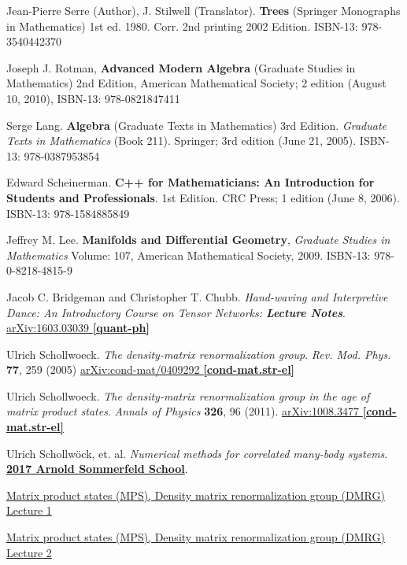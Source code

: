 \documentclass[10pt]{amsart}
\begin{document}
\begin{thebibliography}{9}
Jean-Pierre Serre (Author), J. Stilwell (Translator).  \textbf{Trees} (Springer Monographs in Mathematics) 1st ed. 1980. Corr. 2nd printing 2002 Edition.  ISBN-13: 978-3540442370

Joseph J. Rotman, \textbf{Advanced Modern Algebra} (Graduate Studies in Mathematics) 2nd Edition, American Mathematical Society; 2 edition (August 10, 2010), ISBN-13: 978-0821847411

Serge Lang. \textbf{Algebra} (Graduate Texts in Mathematics) 3rd Edition. \emph{Graduate Texts in Mathematics} (Book 211). Springer; 3rd edition (June 21, 2005). ISBN-13: 978-0387953854

Edward Scheinerman.  \textbf{C++ for Mathematicians: An Introduction for Students and Professionals}. 1st Edition.  CRC Press; 1 edition (June 8, 2006).  ISBN-13: 978-1584885849 


Jeffrey M. Lee. \textbf{Manifolds and Differential Geometry}, \emph{Graduate Studies in Mathematics} Volume: 107, American Mathematical Society, 2009. ISBN-13: 978-0-8218-4815-9

Jacob C. Bridgeman and Christopher T. Chubb.  \emph{Hand-waving and Interpretive Dance: An Introductory Course on Tensor Networks: \textbf{Lecture Notes}}.  \href{https://arxiv.org/abs/1603.03039}{arXiv:1603.03039 \textbf{[quant-ph]}}

Ulrich Schollwoeck.  \emph{The density-matrix renormalization group}.   \emph{Rev. Mod. Phys.} \textbf{77}, 259 (2005)	\href{https://arxiv.org/abs/cond-mat/0409292}{arXiv:cond-mat/0409292 \textbf{[cond-mat.str-el]}}

Ulrich Schollwoeck.  \emph{The density-matrix renormalization group in the age of matrix product states}.  \emph{Annals of Physics} \textbf{326}, 96 (2011).  \href{https://arxiv.org/abs/1008.3477}{arXiv:1008.3477 \textbf{[cond-mat.str-el]}}

Ulrich Schollw\"{o}ck, et. al. \emph{Numerical methods for correlated many-body systems}. \href{https://www.asc.physik.lmu.de/activities/schools/archiv/asc_school_17/index.html}{\textbf{2017 Arnold Sommerfeld School}}. 

\href{https://cast.itunes.uni-muenchen.de/clips/WE0Gf4L6f3/vod/high_quality.mp4}{Matrix product states (MPS), Density matrix renormalization group (DMRG) Lecture 1} 

\href{https://cast.itunes.uni-muenchen.de/clips/1PTFIT1n42/vod/high_quality.mp4}{Matrix product states (MPS), Density matrix renormalization group (DMRG) Lecture 2} 


\end{thebibliography}
\end{document}
